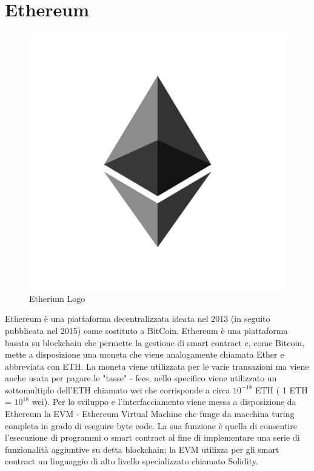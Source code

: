 \documentclass[11pt,a4paper,titlepage]{report}
\begin{document}
\section{Ethereum}

\begin{figure}[h]
	\includegraphics[height=0.2\textheight]{eth}
	\centering
	\caption{Etherium Logo}
	\label{fig:eth-logo}
\end{figure}

Ethereum è una piattaforma decentralizzata ideata nel 2013 (in seguito pubblicata nel 2015) come sostituto a BitCoin. Ethereum è una piattaforma basata su blockchain che permette la gestione di smart contract e, come Bitcoin, mette a disposizione una moneta che viene analogamente chiamata Ether e abbreviata con ETH. La moneta viene utilizzata per le varie transazioni ma viene anche usata per pagare le "tasse" - fees, nello specifico viene utilizzato un sottomultiplo dell'ETH chiamato wei che corrisponde a circa  $ 10^{-18} $ ETH  ( 1 ETH = $ 10^{18} $ wei). Per lo sviluppo e l'interfacciamento viene messa a disposizione da Ethereum la EVM - Ethereum Virtual Machine che funge da macchina turing completa in grado di eseguire byte code. La sua funzione è quella di consentire l'esecuzione di programmi o smart contract al fine di implementare una serie di funzionalità aggiuntive su detta blockchain; la EVM utilizza per gli smart contract un linguaggio di alto livello specializzato chiamato Solidity.
\end{document}
